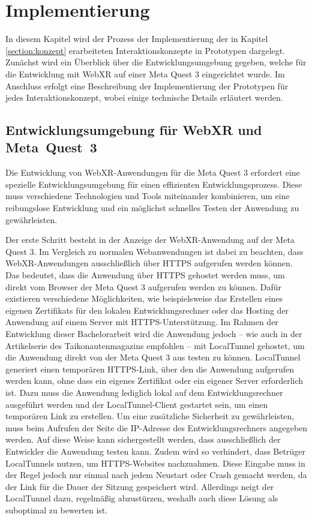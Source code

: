 \chapter{Implementierung} %

In diesem Kapitel wird der Prozess der Implementierung der in Kapitel \ref{section:konzept} erarbeiteten Interaktionskonzepte in Prototypen dargelegt. 
Zunächst wird ein Überblick über die Entwicklungsumgebung gegeben, welche für die Entwicklung mit WebXR auf einer Meta Quest 3 eingerichtet wurde.
Im Anschluss erfolgt eine Beschreibung der Implementierung der Prototypen für jedes Interaktionskonzept, wobei einige technische Details erläutert werden.

\section{Entwicklungsumgebung für WebXR und Meta~Quest~3}

Die Entwicklung von WebXR-Anwendungen für die Meta Quest 3 erfordert eine spezielle Entwicklungsumgebung für einen effizienten Entwicklungsprozess.
Diese muss verschiedene Technologien und Tools miteinander kombinieren, um eine reibungslose Entwicklung und ein möglichst schnelles Testen der Anwendung zu gewährleisten.



Der erste Schritt besteht in der Anzeige der WebXR-Anwendung auf der Meta Quest 3. 
Im Vergleich zu \glqq{}normalen\grqq{} Webanwendungen ist dabei zu beachten, dass WebXR-Anwendungen ausschließlich über HTTPS aufgerufen werden können.
Das bedeutet, dass die Anwendung über HTTPS gehostet werden muss, um direkt vom Browser der Meta Quest 3 aufgerufen werden zu können.
Dafür existieren verschiedene Möglichkeiten, wie beispielsweise das Erstellen eines eigenen Zertifikats für den lokalen Entwicklungsrechner oder das Hosting der Anwendung auf einem Server mit HTTPS-Unterstützung.
Im Rahmen der Entwicklung dieser Bachelorarbeit wird die Anwendung jedoch -- wie auch in der Artikelserie des Taikonautenmagazins \autocite[Part 0/8]{taikonauten-magazine} empfohlen -- mit LocalTunnel gehostet, um die Anwendung direkt von der Meta Quest 3 aus testen zu können.
LocalTunnel generiert einen temporären HTTPS-Link, über den die Anwendung aufgerufen werden kann, ohne dass ein eigenes Zertifikat oder ein eigener Server erforderlich ist.
Dazu muss die Anwendung lediglich lokal auf dem Entwicklungsrechner ausgeführt werden und der LocalTunnel-Client gestartet sein, um einen temporären Link zu erstellen.
Um eine zusätzliche Sicherheit zu gewährleisten, muss beim Aufrufen der Seite die IP-Adresse des Entwicklungsrechners angegeben werden.
Auf diese Weise kann sichergestellt werden, dass ausschließlich der Entwickler die Anwendung testen kann.
Zudem wird so verhindert, dass Betrüger LocalTunnels nutzen, um HTTPS-Websites nachzuahmen.
Diese Eingabe muss in der Regel jedoch nur einmal nach jedem Neustart oder Crash gemacht werden, da der Link für die Dauer der Sitzung gespeichert wird.
Allerdings neigt der LocalTunnel dazu, regelmäßig abzustürzen, weshalb auch diese Lösung als suboptimal zu bewerten ist.

